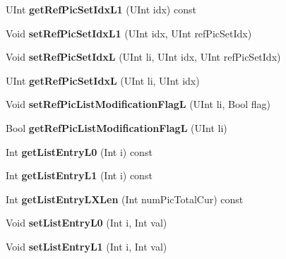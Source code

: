 \begin{DoxyCompactItemize}
\item 
\mbox{\label{class_t_com_ref_pic_list_modification_a1f678d2c1880d6f1a72eeef8f4a8bf2b}} 
U\+Int {\bfseries get\+Ref\+Pic\+Set\+Idx\+L1} (U\+Int idx) const
\item 
\mbox{\label{class_t_com_ref_pic_list_modification_a62c0cd986c17fd912c19ece48b5562dc}} 
Void {\bfseries set\+Ref\+Pic\+Set\+Idx\+L1} (U\+Int idx, U\+Int ref\+Pic\+Set\+Idx)
\item 
\mbox{\label{class_t_com_ref_pic_list_modification_afad7aacddca058c9495ba936efc1424a}} 
Void {\bfseries set\+Ref\+Pic\+Set\+IdxL} (U\+Int li, U\+Int idx, U\+Int ref\+Pic\+Set\+Idx)
\item 
\mbox{\label{class_t_com_ref_pic_list_modification_a9888244793d53d532daa7be7b0e35911}} 
U\+Int {\bfseries get\+Ref\+Pic\+Set\+IdxL} (U\+Int li, U\+Int idx)
\item 
\mbox{\label{class_t_com_ref_pic_list_modification_a6b93aa22528367971ac6640f24f7347a}} 
Void {\bfseries set\+Ref\+Pic\+List\+Modification\+FlagL} (U\+Int li, Bool flag)
\item 
\mbox{\label{class_t_com_ref_pic_list_modification_a467e196e20d5d7527e27ea77e5c2dbfb}} 
Bool {\bfseries get\+Ref\+Pic\+List\+Modification\+FlagL} (U\+Int li)
\item 
\mbox{\label{class_t_com_ref_pic_list_modification_ab30d4329cae5aea65d71b9d4535aff12}} 
Int {\bfseries get\+List\+Entry\+L0} (Int i) const
\item 
\mbox{\label{class_t_com_ref_pic_list_modification_a0f48a771f6dea915726add56a828b67b}} 
Int {\bfseries get\+List\+Entry\+L1} (Int i) const
\item 
\mbox{\label{class_t_com_ref_pic_list_modification_aeec0f32c0d0d860a56e64b74f61864bb}} 
Int {\bfseries get\+List\+Entry\+L\+X\+Len} (Int num\+Pic\+Total\+Cur) const
\item 
\mbox{\label{class_t_com_ref_pic_list_modification_a333f753eacaee30a2edc9dfc8be674d1}} 
Void {\bfseries set\+List\+Entry\+L0} (Int i, Int val)
\item 
\mbox{\label{class_t_com_ref_pic_list_modification_ae9a860cfe70f13d4263f4dbc344b1bf2}} 
Void {\bfseries set\+List\+Entry\+L1} (Int i, Int val)
\end{DoxyCompactItemize}
{\bf }\par



